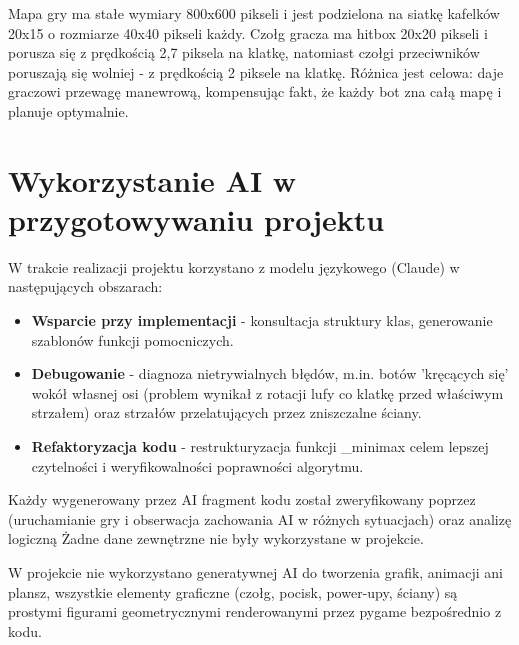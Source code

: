Mapa gry ma stałe wymiary 800x600 pikseli i jest podzielona na siatkę kafelków 20x15 o rozmiarze 40x40 pikseli każdy. 
Czołg gracza ma hitbox 20x20 pikseli i porusza się z prędkością 2,7 piksela na klatkę, natomiast czołgi przeciwników 
poruszają się wolniej - z prędkością 2 piksele na klatkę. Różnica jest celowa: daje graczowi 
przewagę manewrową, kompensując fakt, że każdy bot zna całą mapę i planuje optymalnie.

\section{Wykorzystanie AI w przygotowywaniu projektu}

W trakcie realizacji projektu korzystano z modelu językowego (Claude) w następujących obszarach:
 
\begin{itemize}
    \item \textbf{Wsparcie przy implementacji} - konsultacja struktury klas, generowanie szablonów funkcji pomocniczych.
    \item \textbf{Debugowanie} - diagnoza nietrywialnych błędów, m.in. botów 'kręcących się' wokół własnej osi 
    (problem wynikał z rotacji lufy co klatkę przed właściwym strzałem) oraz strzałów przelatujących przez zniszczalne ściany.
    \item \textbf{Refaktoryzacja kodu} - restrukturyzacja funkcji \_minimax celem lepszej czytelności i weryfikowalności 
    poprawności algorytmu.
\end{itemize}
 
Każdy wygenerowany przez AI fragment kodu został zweryfikowany poprzez 
(uruchamianie gry i obserwacja zachowania AI w różnych sytuacjach) oraz analizę logiczną 
Żadne dane zewnętrzne nie były wykorzystane w projekcie.
 
W projekcie nie wykorzystano generatywnej AI do tworzenia grafik, animacji ani plansz, 
wszystkie elementy graficzne (czołg, pocisk, power-upy, ściany) są prostymi figurami geometrycznymi renderowanymi przez
pygame bezpośrednio z kodu.